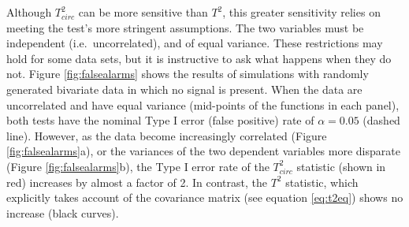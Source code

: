 \documentclass[]{article}
\begin{document}
Although \(T^2_{circ}\) can be more sensitive than \(T^2\), this greater sensitivity relies on meeting the test's more stringent assumptions. The two variables must be independent (i.e.~uncorrelated), and of equal variance. These restrictions may hold for some data sets, but it is instructive to ask what happens when they do not. Figure \ref{fig:falsealarms} shows the results of simulations with randomly generated bivariate data in which no signal is present. When the data are uncorrelated and have equal variance (mid-points of the functions in each panel), both tests have the nominal Type I error (false positive) rate of \(\alpha = 0.05\) (dashed line). However, as the data become increasingly correlated (Figure \ref{fig:falsealarms}a), or the variances of the two dependent variables more disparate (Figure \ref{fig:falsealarms}b), the Type I error rate of the \(T^2_{circ}\) statistic (shown in red) increases by almost a factor of 2. In contrast, the \(T^2\) statistic, which explicitly takes account of the covariance matrix (see equation \eqref{eq:t2eq}) shows no increase (black curves).
\end{document}
